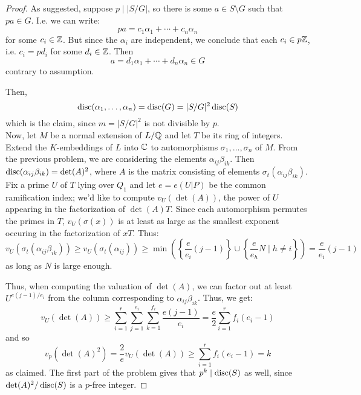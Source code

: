 \begin{proof}
	As suggested, suppose $p \mid |S/G|$, so there is some $a \in S \setminus G$ such that $pa \in G$. I.e. we can write:
	\[ pa = c_1\alpha_1 + \cdots + c_n\alpha_n \]
	for some $c_i \in \mathbb{Z}$. But since the $\alpha_i$ are independent, we conclude that each $c_i \in p\mathbb{Z}$, i.e. $c_i = pd_i$ for some $d_i \in \mathbb{Z}$. Then
	\[ a = d_1\alpha_1 + \cdots + d_n\alpha_n \in G \]
	contrary to assumption.
	
	Then,
	\[ \operatorname{disc}(\alpha_1,\ldots,\alpha_n) = \operatorname{disc}(G) = |S/G|^2\operatorname{disc}(S) \]
	which is the claim, since $m = |S/G|^2$ is not divisible by $p$. \\
	
	Now, let $M$ be a normal extension of $L/\mathbb{Q}$ and let $T$ be its ring of integers. Extend the $K$-embeddings of $L$ into $\mathbb{C}$ to automorphisms $\sigma_1,\ldots,\sigma_n$ of $M$. From the previous problem, we are considering the elements $\alpha_{ij}\beta_{ik}$. Then $\operatorname{disc}(\alpha_{ij}\beta_{ik}) = \det(A)^2$, where $A$ is the matrix consisting of elements $\sigma_t(\alpha_{ij}\beta_{ik})$. Fix a prime $U$ of $T$ lying over $Q_1$ and let $e = e(U|P)$ be the common ramification index; we'd like to compute $v_U(\det(A))$, the power of $U$ appearing in the factorization of $\det(A)T$. Since each automorphism permutes the primes in $T$, $v_U(\sigma(x))$ is at least as large as the smallest exponent occuring in the factorization of $xT$. Thus:
	\[ v_U(\sigma_t(\alpha_{ij}\beta_{ik})) \geq v_U(\sigma_t(\alpha_{ij})) \geq \min\left(\left\{\frac{e}{e_i}(j-1)\right\} \cup \left\{ \frac{e}{e_h}N \mid h \neq i \right\}\right) = \frac{e}{e_i}(j-1) \]
	as long as $N$ is large enough.
	
	Thus, when computing the valuation of $\det(A)$, we can factor out at least $U^{e(j-1)/e_i}$ from the column corresponding to $\alpha_{ij}\beta_{ik}$. Thus, we get:
	\[ v_U(\det(A)) \geq \sum_{i=1}^r \sum_{j=1}^{e_i} \sum_{k=1}^{f_i} \frac{e(j-1)}{e_i} = \frac{e}{2}\sum_{i=1}^r f_i(e_i-1) \]
	and so
	\[ v_p(\det(A)^2) = \frac{2}{e}v_U(\det(A)) \geq \sum_{i=1}^r f_i(e_i-1) = k \]
	as claimed. The first part of the problem gives that $p^k \mid \operatorname{disc}(S)$ as well, since $\det(A)^2/\operatorname{disc}(S)$ is a $p$-free integer.
\end{proof}
